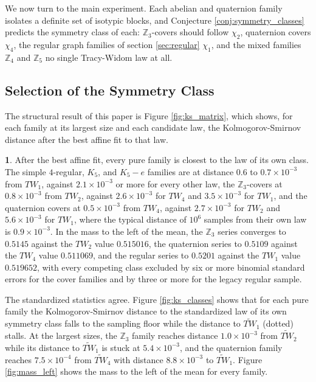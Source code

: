 \documentclass[12pt,oneside,english]{amsart}
\numberwithin{equation}{section}
\numberwithin{figure}{section}
\numberwithin{table}{section}
\theoremstyle{plain}
\numberwithin{thm}{section}
\theoremstyle{plain}
\theoremstyle{plain}
\theoremstyle{plain}
\theoremstyle{definition}
\theoremstyle{definition}
\newtheorem{numresult}[thm]{\protect\numresultname}
\theoremstyle{definition}
\theoremstyle{remark}
\providecommand{\numresultname}{Numerical Result}
\begin{document}
We now turn to the main experiment. Each abelian and quaternion family
isolates a definite set of isotypic blocks, and Conjecture \ref{conj:symmetry_classes}
predicts the symmetry class of each: $\mathbb{Z}_{3}$-covers should
follow $\chi_{2}$, quaternion covers $\chi_{4}$, the regular graph
families of section \ref{sec:regular} $\chi_{1}$, and the mixed
families $\mathbb{Z}_{4}$ and $\mathbb{Z}_{5}$ no single Tracy-Widom
law at all.

\subsection{\label{subsec:selection}Selection of the Symmetry Class}

The structural result of this paper is Figure \ref{fig:ks_matrix},
which shows, for each family at its largest size and each candidate
law, the Kolmogorov-Smirnov distance after the best affine fit to
that law.
\begin{numresult}
\label{nr:class_selection}After the best affine fit, every pure family
is closest to the law of its own class. The simple $4$-regular, $K_{5}$,
and $K_{5}-e$ families are at distance $0.6$ to $0.7\times10^{-3}$
from $TW_{1}$, against $2.1\times10^{-3}$ or more for every other
law, the $\mathbb{Z}_{3}$-covers at $0.8\times10^{-3}$ from $TW_{2}$,
against $2.6\times10^{-3}$ for $TW_{4}$ and $3.5\times10^{-3}$
for $TW_{1}$, and the quaternion covers at $0.5\times10^{-3}$ from
$TW_{4}$, against $2.7\times10^{-3}$ for $TW_{2}$ and $5.6\times10^{-3}$
for $TW_{1}$, where the typical distance of $10^{6}$ samples from
their own law is $0.9\times10^{-3}$. In the mass to the left of the
mean, the $\mathbb{Z}_{3}$ series converges to $0.5145$ against the
$TW_{2}$ value $0.515016$, the quaternion series to $0.5109$ against
the $TW_{4}$ value $0.511069$, and the regular series to $0.5201$
against the $TW_{1}$ value $0.519652$, with every competing class
excluded by six or more binomial standard errors for the cover families
and by three or more for the legacy regular sample.
\end{numresult}
The standardized statistics agree. Figure \ref{fig:ks_classes} shows
that for each pure family the Kolmogorov-Smirnov distance to the standardized
law of its own symmetry class falls to the sampling floor while the
distance to $\widetilde{TW}_{1}$ (dotted) stalls. At the largest sizes,
the $\mathbb{Z}_{3}$ family reaches distance $1.0\times10^{-3}$
from $\widetilde{TW}_{2}$ while its distance to $\widetilde{TW}_{1}$
is stuck at $5.4\times10^{-3}$, and the quaternion family reaches
$7.5\times10^{-4}$ from $\widetilde{TW}_{4}$ with distance $8.8\times10^{-3}$
to $\widetilde{TW}_{1}$. Figure \ref{fig:mass_left} shows the mass
to the left of the mean for every family.
\end{document}
